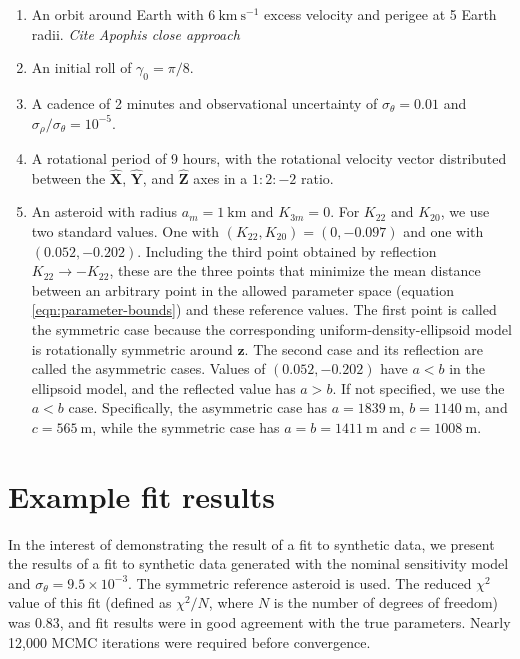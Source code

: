 \documentclass{aastex631}
\newcommand{\unit}[1]{\hat{\bm{#1}}}
\newcommand{\jtd}[1]{{\color{red}\textit{#1}}}
\newcommand{\siunit}[1]{\ \textrm{#1}}
\newcommand{\per}[1]{\ \textrm{#1}^{-1}}
\begin{document}
\begin{enumerate}
  \item An orbit around Earth with $6\siunit{km}\per{s}$ excess velocity and perigee at 5 Earth radii. \jtd{Cite Apophis close approach}
  \item An initial roll of $\gamma_0=\pi/8$.
  \item A cadence of 2 minutes and observational uncertainty of $\sigma_\theta = 0.01$ and $\sigma_\rho / \sigma_\theta = 10^{-5}$.
  \item A rotational period of 9 hours, with the rotational velocity vector distributed between the $\unit X$, $\unit Y$, and $\unit Z$ axes in a $1:2:-2$ ratio.
  \item An asteroid with radius $a_m = 1\siunit{km}$ and $K_{3m}=0$. For $K_{22}$ and $K_{20}$, we use two standard values. One with $(K_{22}, K_{20}) = (0, -0.097)$ and one with $(0.052, -0.202)$. Including the third point obtained by reflection $K_{22}\rightarrow -K_{22}$, these are the three points that minimize the mean distance between an arbitrary point in the allowed parameter space (equation \ref{eqn:parameter-bounds}) and these reference values. The first point is called the symmetric case because the corresponding uniform-density-ellipsoid model is rotationally symmetric around $\unit z$. The second case and its reflection are called the asymmetric cases. Values of $(0.052, -0.202)$ have $a < b$ in the ellipsoid model, and the reflected value has $a > b$. If not specified, we use the $a < b$ case. Specifically, the asymmetric case has $a=1839\siunit{m}$, $b=1140\siunit{m}$, and $c=565\siunit{m}$, while the symmetric case has $a=b=1411\siunit{m}$ and $c=1008\siunit{m}$.
\end{enumerate}



\section{Example fit results}
In the interest of demonstrating the result of a fit to synthetic data, we present the results of a fit to synthetic data generated with the nominal sensitivity model and $\sigma_\theta = 9.5 \times 10^{-3}$. The symmetric reference asteroid is used. The reduced $\chi^2$ value of this fit (defined as $\chi^2 / N$, where $N$ is the number of degrees of freedom) was 0.83, and fit results were in good agreement with the true parameters. Nearly 12,000 MCMC iterations were required before convergence.
\end{document}
